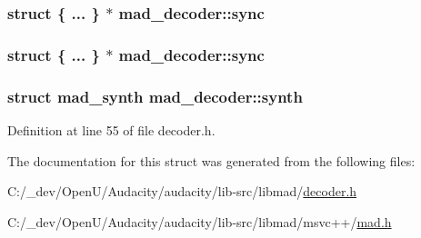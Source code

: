\subsubsection[{\texorpdfstring{sync}{sync}}]{\setlength{\rightskip}{0pt plus 5cm}struct \{ ... \}  $\ast$ mad\+\_\+decoder\+::sync}\hypertarget{structmad__decoder_ab538d28564eee3451206a99cd54c84c9}{}\label{structmad__decoder_ab538d28564eee3451206a99cd54c84c9}
\subsubsection[{\texorpdfstring{sync}{sync}}]{\setlength{\rightskip}{0pt plus 5cm}struct \{ ... \}  $\ast$ mad\+\_\+decoder\+::sync}\hypertarget{structmad__decoder_a40b36ee850dfdf7317fa2e7ac3377450}{}\label{structmad__decoder_a40b36ee850dfdf7317fa2e7ac3377450}
\subsubsection[{\texorpdfstring{synth}{synth}}]{\setlength{\rightskip}{0pt plus 5cm}struct {\bf mad\+\_\+synth} mad\+\_\+decoder\+::synth}\hypertarget{structmad__decoder_a7fda021db48c654ff0db728dd5c040a3}{}\label{structmad__decoder_a7fda021db48c654ff0db728dd5c040a3}


Definition at line 55 of file decoder.\+h.



The documentation for this struct was generated from the following files\+:\begin{DoxyCompactItemize}
\item 
C\+:/\+\_\+dev/\+Open\+U/\+Audacity/audacity/lib-\/src/libmad/\hyperlink{libmad_2decoder_8h}{decoder.\+h}\item 
C\+:/\+\_\+dev/\+Open\+U/\+Audacity/audacity/lib-\/src/libmad/msvc++/\hyperlink{lib-src_2libmad_2msvc_09_09_2mad_8h}{mad.\+h}\end{DoxyCompactItemize}
